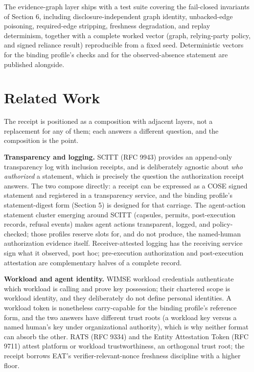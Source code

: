 \documentclass[11pt]{article}
\begin{document}
The evidence-graph layer ships with a test suite covering the fail-closed
invariants of Section 6, including disclosure-independent graph identity,
unbacked-edge poisoning, required-edge stripping, freshness degradation, and replay
determinism, together with a complete worked vector (graph, relying-party policy,
and signed reliance result) reproducible from a fixed seed. Deterministic vectors
for the binding profile's checks and for the observed-absence statement are
published alongside.

\section{Related Work}

The receipt is positioned as a composition with adjacent layers, not a replacement
for any of them; each answers a different question, and the composition is the
point.

\textbf{Transparency and logging.} SCITT (RFC 9943) provides an append-only
transparency log with inclusion receipts, and is deliberately agnostic about
\emph{who authorized} a statement, which is precisely the question the
authorization receipt answers. The two compose directly: a receipt can be expressed
as a COSE signed statement and registered in a transparency service, and the
binding profile's statement-digest form (Section 5) is designed for that carriage.
The agent-action statement cluster emerging around SCITT (capsules, permits,
post-execution records, refusal events) makes agent actions transparent, logged, and
policy-checked; those profiles reserve slots for, and do not produce, the
named-human authorization evidence itself. Receiver-attested logging has the
receiving service sign what it observed, post hoc; pre-execution authorization and
post-execution attestation are complementary halves of a complete record.

\textbf{Workload and agent identity.} WIMSE workload credentials authenticate which
workload is calling and prove key possession; their chartered scope is workload
identity, and they deliberately do not define personal identities. A workload token
is nonetheless carry-capable for the binding profile's reference form, and the two
answers have different trust roots (a workload key versus a named human's key under
organizational authority), which is why neither format can absorb the other. RATS
(RFC 9334) and the Entity Attestation Token (RFC 9711) attest platform or workload
trustworthiness, an orthogonal trust root; the receipt borrows EAT's
verifier-relevant-nonce freshness discipline with a higher floor.
\end{document}
